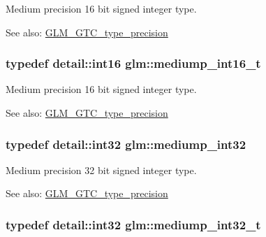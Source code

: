 Medium precision 16 bit signed integer type. \begin{Desc}
\item[See also:]\hyperlink{group__gtc__type__precision}{GLM\_\-GTC\_\-type\_\-precision} \end{Desc}
\hypertarget{group__gtc__type__precision_g478fab608cf43040013d719a3e03b194}{
\subsubsection[mediump\_\-int16\_\-t]{\setlength{\rightskip}{0pt plus 5cm}typedef detail::int16 {\bf glm::mediump\_\-int16\_\-t}}}
\label{group__gtc__type__precision_g478fab608cf43040013d719a3e03b194}


Medium precision 16 bit signed integer type. \begin{Desc}
\item[See also:]\hyperlink{group__gtc__type__precision}{GLM\_\-GTC\_\-type\_\-precision} \end{Desc}
\hypertarget{group__gtc__type__precision_g0660a752402702f420f13c686a7fff29}{
\subsubsection[mediump\_\-int32]{\setlength{\rightskip}{0pt plus 5cm}typedef detail::int32 {\bf glm::mediump\_\-int32}}}
\label{group__gtc__type__precision_g0660a752402702f420f13c686a7fff29}


Medium precision 32 bit signed integer type. \begin{Desc}
\item[See also:]\hyperlink{group__gtc__type__precision}{GLM\_\-GTC\_\-type\_\-precision} \end{Desc}
\hypertarget{group__gtc__type__precision_gfd9b4bd9e4465aec63351b59100692c4}{
\subsubsection[mediump\_\-int32\_\-t]{\setlength{\rightskip}{0pt plus 5cm}typedef detail::int32 {\bf glm::mediump\_\-int32\_\-t}}}
\label{group__gtc__type__precision_gfd9b4bd9e4465aec63351b59100692c4}


